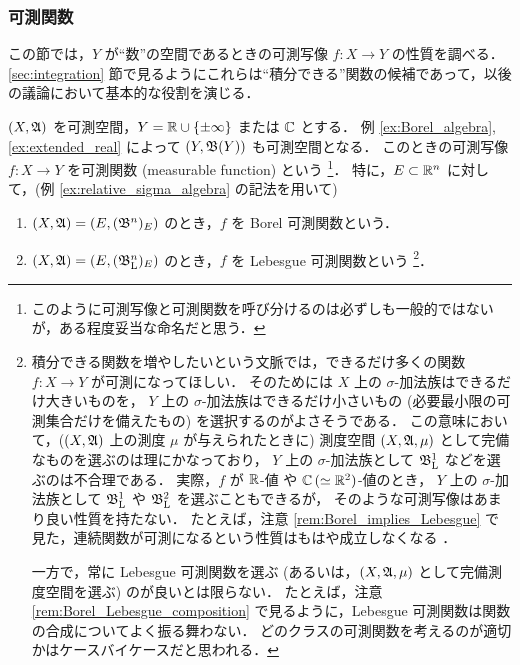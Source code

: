 \subsubsection{可測関数}

この節では，$Y$ が``数''の空間であるときの可測写像 $f:X\to Y$ の性質を調べる．
\ref{sec:integration} 節で見るようにこれらは``積分できる''関数の候補であって，以後の議論において基本的な役割を演じる．

\begin{definition}\label{def:measurable_function}
    $(X,\mathfrak{A})$ を可測空間，$Y=\mathbb{R}\cup\{\pm\infty\} $ または $\mathbb{C}$ とする．
    例 \ref{ex:Borel_algebra}, \ref{ex:extended_real} によって $(Y,\mathfrak{B}(Y))$ も可測空間となる．
    このときの可測写像 $f:X\to Y$ を可測関数 (measurable function) という
    \footnote{このように可測写像と可測関数を呼び分けるのは必ずしも一般的ではないが，ある程度妥当な命名だと思う\cite{ms95741}．}．
    特に，$E\subset\mathbb{R}^n$ に対して，(例 \ref{ex:relative_sigma_algebra} の記法を用いて)
    \begin{enumerate}
        \item $(X,\mathfrak{A})=(E,(\mathfrak{B}^n)_E)$ のとき，$f$ を Borel 可測関数という．
        \item $(X,\mathfrak{A})=(E,(\mathfrak{B}_{\mathrm{L}}^n)_E)$ のとき，$f$ を Lebesgue 可測関数という
            \footnote{
                積分できる関数を増やしたいという文脈では，できるだけ多くの関数 $f:X\to Y$ が可測になってほしい．
                そのためには $X$ 上の $\sigma$-加法族はできるだけ大きいものを，
                $Y$ 上の $\sigma$-加法族はできるだけ小さいもの (必要最小限の可測集合だけを備えたもの) を選択するのがよさそうである．
                この意味において，($(X,\mathfrak{A})$ 上の測度 $\mu$ が与えられたときに) 測度空間 $(X,\mathfrak{A},\mu)$ として完備なものを選ぶのは理にかなっており，
                $Y$ 上の $\sigma$-加法族として $\mathfrak{B}_{\mathrm{L}}^1$ などを選ぶのは不合理である．
                実際，$f$ が $\mathbb{R}$-値 や $\mathbb{C}\,(\simeq\mathbb{R}^2)$-値のとき，
                $Y$ 上の $\sigma$-加法族として $\mathfrak{B}_{\mathrm{L}}^1$ や $\mathfrak{B}_{\mathrm{L}}^2$ を選ぶこともできるが，
                そのような可測写像はあまり良い性質を持たない．
                たとえば，注意 \ref{rem:Borel_implies_Lebesgue} で見た，連続関数が可測になるという性質はもはや成立しなくなる \cite{mo31603}．

                一方で，常に Lebesgue 可測関数を選ぶ (あるいは，$(X,\mathfrak{A},\mu)$ として完備測度空間を選ぶ) のが良いとは限らない．
                たとえば，注意 \ref{rem:Borel_Lebesgue_composition} で見るように，Lebesgue 可測関数は関数の合成についてよく振る舞わない．
                どのクラスの可測関数を考えるのが適切かはケースバイケースだと思われる．
            }．
    \end{enumerate}
\end{definition}

